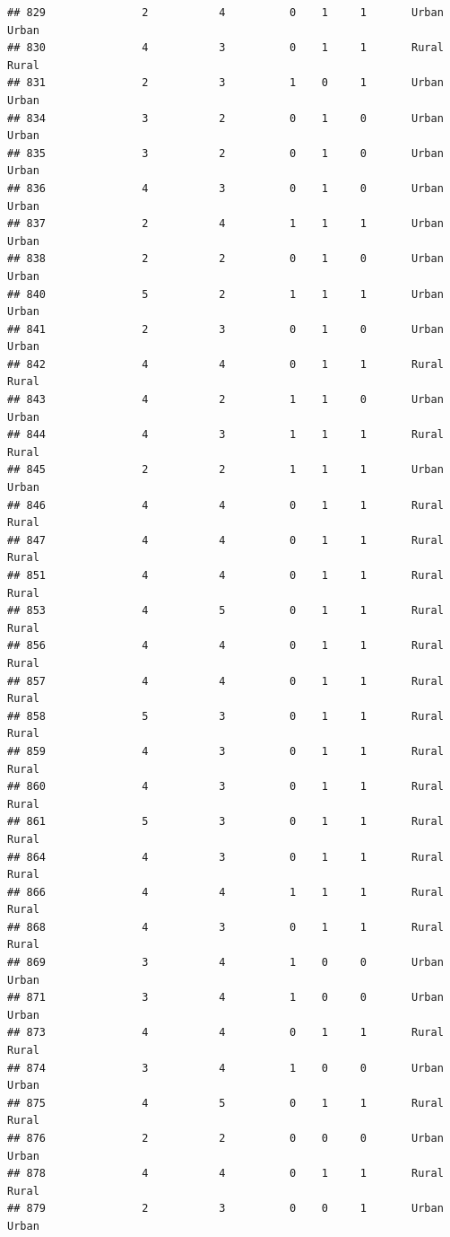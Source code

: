 \documentclass[
]{article}
\begin{document}
\begin{verbatim}
## 829               2           4          0    1     1       Urban Urban
## 830               4           3          0    1     1       Rural Rural
## 831               2           3          1    0     1       Urban Urban
## 834               3           2          0    1     0       Urban Urban
## 835               3           2          0    1     0       Urban Urban
## 836               4           3          0    1     0       Urban Urban
## 837               2           4          1    1     1       Urban Urban
## 838               2           2          0    1     0       Urban Urban
## 840               5           2          1    1     1       Urban Urban
## 841               2           3          0    1     0       Urban Urban
## 842               4           4          0    1     1       Rural Rural
## 843               4           2          1    1     0       Urban Urban
## 844               4           3          1    1     1       Rural Rural
## 845               2           2          1    1     1       Urban Urban
## 846               4           4          0    1     1       Rural Rural
## 847               4           4          0    1     1       Rural Rural
## 851               4           4          0    1     1       Rural Rural
## 853               4           5          0    1     1       Rural Rural
## 856               4           4          0    1     1       Rural Rural
## 857               4           4          0    1     1       Rural Rural
## 858               5           3          0    1     1       Rural Rural
## 859               4           3          0    1     1       Rural Rural
## 860               4           3          0    1     1       Rural Rural
## 861               5           3          0    1     1       Rural Rural
## 864               4           3          0    1     1       Rural Rural
## 866               4           4          1    1     1       Rural Rural
## 868               4           3          0    1     1       Rural Rural
## 869               3           4          1    0     0       Urban Urban
## 871               3           4          1    0     0       Urban Urban
## 873               4           4          0    1     1       Rural Rural
## 874               3           4          1    0     0       Urban Urban
## 875               4           5          0    1     1       Rural Rural
## 876               2           2          0    0     0       Urban Urban
## 878               4           4          0    1     1       Rural Rural
## 879               2           3          0    0     1       Urban Urban

\end{verbatim}
\end{document}
